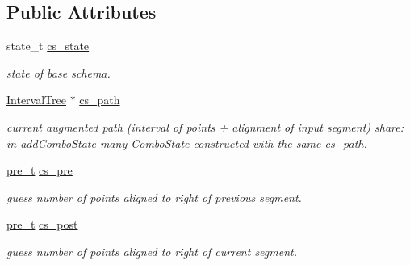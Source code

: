 \subsection*{Public Attributes}
\begin{DoxyCompactItemize}
\item 
\mbox{\label{classComboState_a2b079a791c60d80762ac637b520fc17c}} 
state\+\_\+t \mbox{\hyperlink{classComboState_a2b079a791c60d80762ac637b520fc17c}{cs\+\_\+state}}
\begin{DoxyCompactList}\small\item\em state of base schema. \end{DoxyCompactList}\item 
\mbox{\label{classComboState_a12b750a5d435968342c756dd5ae08777}} 
\mbox{\hyperlink{classIntervalTree}{Interval\+Tree}} $\ast$ \mbox{\hyperlink{classComboState_a12b750a5d435968342c756dd5ae08777}{cs\+\_\+path}}
\begin{DoxyCompactList}\small\item\em current augmented path (interval of points + alignment of input segment) share\+: in add\+Combo\+State many \mbox{\hyperlink{classComboState}{Combo\+State}} constructed with the same cs\+\_\+path. \end{DoxyCompactList}\item 
\mbox{\label{classComboState_a22b317fc2ff9848dd35a232da73df5f9}} 
\mbox{\hyperlink{group__general_ga092fe8b972dfa977c2a0886720a7731e}{pre\+\_\+t}} \mbox{\hyperlink{classComboState_a22b317fc2ff9848dd35a232da73df5f9}{cs\+\_\+pre}}
\begin{DoxyCompactList}\small\item\em guess number of points aligned to right of previous segment. \end{DoxyCompactList}\item 
\mbox{\label{classComboState_adda67e672871773210ed90e6f60d6752}} 
\mbox{\hyperlink{group__general_ga092fe8b972dfa977c2a0886720a7731e}{pre\+\_\+t}} \mbox{\hyperlink{classComboState_adda67e672871773210ed90e6f60d6752}{cs\+\_\+post}}
\begin{DoxyCompactList}\small\item\em guess number of points aligned to right of current segment. \end{DoxyCompactList}\end{DoxyCompactItemize}
